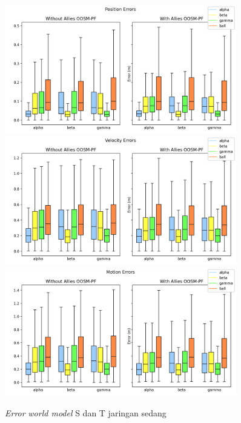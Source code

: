 \begin{figure}[p]
    \centering
    \medskip
    \includegraphics[width=0.9\textwidth]{resources/cfg2_AS_AT_error_pos.png}
    \includegraphics[width=0.9\textwidth]{resources/cfg2_AS_AT_error_vel.png}
    \includegraphics[width=0.9\textwidth]{resources/cfg2_AS_AT_error_motion.png}
    \caption{\textit{Error} \textit{world model} S dan T jaringan sedang}
    \label{fig:2-s-t-error}
    \bigskip
\end{figure}

